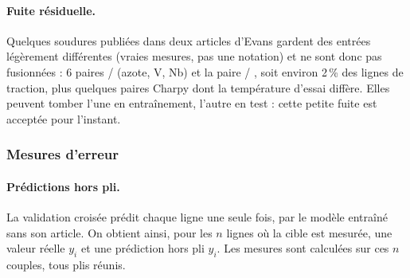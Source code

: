 \paragraph{Fuite résiduelle.} Quelques soudures publiées dans deux articles d'Evans
gardent des entrées légèrement différentes (vraies mesures, pas une notation) et ne sont
donc pas fusionnées : 6 paires  / 
(azote, V, Nb) et la paire  / , soit
environ 2\,\% des lignes de traction, plus quelques paires Charpy dont la température
d'essai diffère. Elles peuvent tomber l'une en entraînement, l'autre en test : cette petite
fuite est acceptée pour l'instant.


\subsubsection{Mesures d'erreur}\label{sec:mesures}

\paragraph{Prédictions hors pli.} La validation croisée prédit chaque ligne une seule
fois, par le modèle entraîné sans son article. On obtient ainsi, pour les $n$ lignes où la
cible est mesurée, une valeur réelle $y_i$ et une prédiction hors pli $\hat y_i$. Les
mesures sont calculées sur ces $n$ couples, tous plis réunis.

